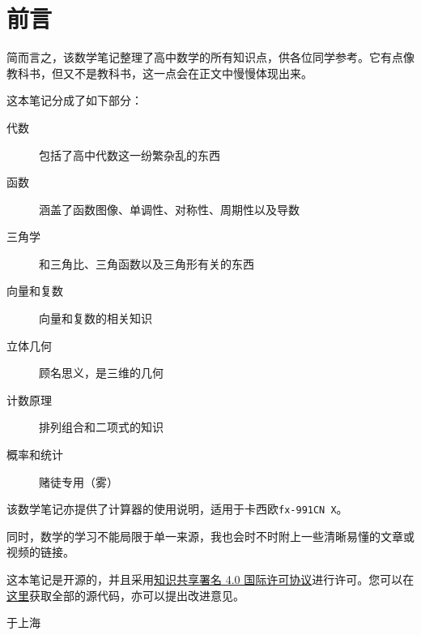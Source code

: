 \section*{前言}
简而言之，该数学笔记整理了高中数学的所有知识点，供各位同学参考。它有点像教科书，但又不是教科书，这一点会在正文中慢慢体现出来。

这本笔记分成了如下部分：

\begin{description}
	\item[代数] 包括了高中代数这一纷繁杂乱的东西
	\item[函数] 涵盖了函数图像、单调性、对称性、周期性以及导数
	\item[三角学] 和三角比、三角函数以及三角形有关的东西
	\item[向量和复数] 向量和复数的相关知识
	\item[立体几何] 顾名思义，是三维的几何
	\item[计数原理] 排列组合和二项式的知识
	\item[概率和统计] 赌徒专用（雾）
\end{description}

该数学笔记亦提供了计算器的使用说明，适用于卡西欧\verb|fx-991CN X|。

同时，数学的学习不能局限于单一来源，我也会时不时附上一些清晰易懂的文章或视频的链接。

这本笔记是开源的，并且采用\href{https://creativecommons.org/licenses/by/4.0}{知识共享署名 4.0 国际许可协议}进行许可。您可以在\href{https://github.com/jason-bowen-zheng/math-notes}{这里}获取全部的源代码，亦可以提出改进意见。
\hypersetup{hidelinks}

\begin{flushright}
	\date{2022年11月}于上海
\end{flushright}
